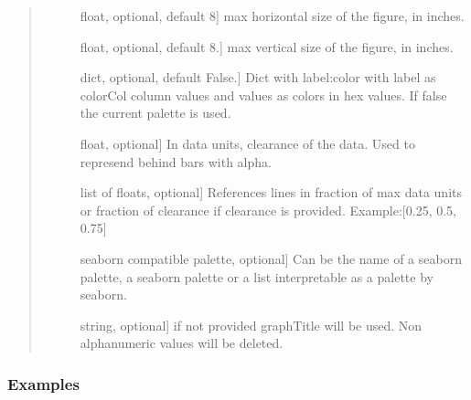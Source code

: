 \documentclass[letterpaper,10pt,english]{sphinxmanual}
\begin{document}
\begin{fulllineitems}
\begin{quote}
\begin{description}
\begin{description}
\item[{}] \leavevmode{[}float, optional, default 8{]}
max horizontal size of the figure, in inches.

\item[{}] \leavevmode{[}float, optional, default 8.{]}
max vertical size of the figure, in inches.

\item[{}] \leavevmode{[}dict, optional, default False.{]}
Dict with label:color with label as colorCol column values 
and values as colors in hex values. 
If false the current palette is used.

\item[{}] \leavevmode{[}float, optional{]}
In data units, clearance of the data. 
Used to represend behind bars with alpha.

\item[{}] \leavevmode{[}list of floats, optional{]}
References lines in fraction of max data units 
or fraction of clearance if clearance is provided.
Example:{[}0.25, 0.5, 0.75{]}

\item[{}] \leavevmode{[}seaborn compatible palette, optional{]}
Can be the name of a seaborn palette, 
a seaborn palette or a list interpretable 
as a palette by seaborn.

\item[{}] \leavevmode{[}string, optional{]}
if not provided graphTitle will be used. 
Non alphanumeric values will be deleted.

\end{description}

\end{description}\end{quote}
\subsubsection*{Examples}


\end{fulllineitems}
\end{document}
